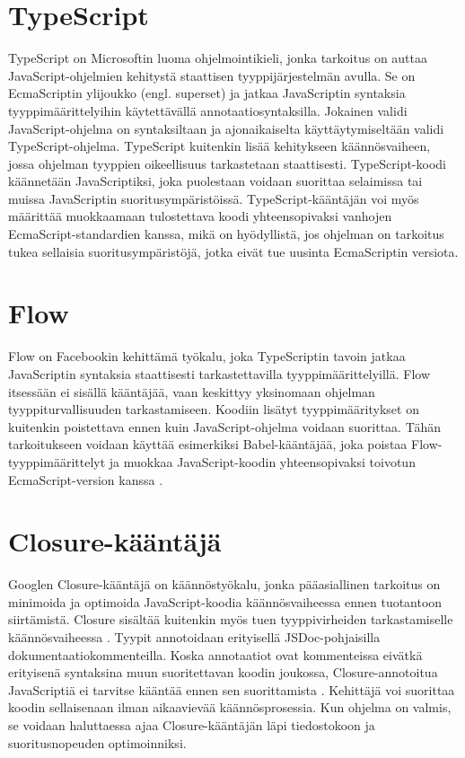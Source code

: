 \section{TypeScript}
TypeScript on Microsoftin luoma ohjelmointikieli, jonka tarkoitus on
auttaa JavaScript-ohjelmien kehitystä staattisen tyyppijärjestelmän avulla.
Se on EcmaScriptin ylijoukko (engl. superset) \cite{TypeScriptSpec} ja jatkaa
JavaScriptin syntaksia tyyppimäärittelyihin käytettävällä
annotaatiosyntaksilla. Jokainen validi JavaScript-ohjelma on syntaksiltaan ja
ajonaikaiselta käyttäytymiseltään validi TypeScript-ohjelma. TypeScript
kuitenkin lisää kehitykseen käännösvaiheen, jossa ohjelman tyyppien
oikeellisuus tarkastetaan staattisesti. TypeScript-koodi käännetään
JavaScriptiksi, joka puolestaan voidaan suorittaa selaimissa tai muissa
JavaScriptin suoritusympäristöissä. TypeScript-kääntäjän voi myös määrittää
muokkaamaan tulostettava koodi yhteensopivaksi vanhojen
EcmaScript-standardien kanssa, mikä on hyödyllistä, jos ohjelman on tarkoitus
tukea sellaisia suoritusympäristöjä, jotka eivät tue uusinta EcmaScriptin
versiota.

\section{Flow}
Flow on Facebookin kehittämä työkalu, joka TypeScriptin tavoin jatkaa
JavaScriptin syntaksia staattisesti tarkastettavilla tyyppimäärittelyillä.
Flow itsessään ei sisällä kääntäjää, vaan keskittyy yksinomaan ohjelman
tyyppiturvallisuuden tarkastamiseen. Koodiin lisätyt tyyppimääritykset on
kuitenkin poistettava ennen kuin JavaScript-ohjelma voidaan suorittaa. Tähän
tarkoitukseen voidaan käyttää esimerkiksi Babel-kääntäjää, joka poistaa
Flow-tyyppimäärittelyt ja muokkaa JavaScript-koodin yhteensopivaksi toivotun
EcmaScript-version kanssa \cite{FlowInstallation}.

\section{Closure-kääntäjä}
Googlen Closure-kääntäjä on käännöstyökalu, jonka pääasiallinen tarkoitus
on minimoida ja optimoida JavaScript-koodia käännösvaiheessa ennen tuotantoon
siirtämistä. Closure sisältää kuitenkin myös tuen tyyppivirheiden
tarkastamiselle käännösvaiheessa \cite{ClosureCompiler}. Tyypit annotoidaan
erityisellä JSDoc-pohjaisilla dokumentaatiokommenteilla. Koska annotaatiot
ovat kommenteissa eivätkä erityisenä syntaksina muun suoritettavan koodin
joukossa, Closure-annotoitua JavaScriptiä ei tarvitse kääntää ennen sen
suorittamista \cite{annotatingJSforClosure}. Kehittäjä voi suorittaa koodin
sellaisenaan ilman aikaavievää käännösprosessia. Kun ohjelma on valmis,
se voidaan haluttaessa ajaa Closure-kääntäjän läpi tiedostokoon
ja suoritusnopeuden optimoinniksi.
